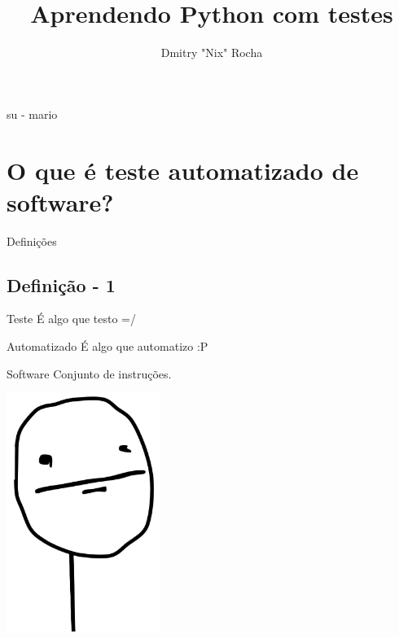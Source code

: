 \documentclass[]{beamer}
\author{Dmitry "Nix" Rocha}
\title{Aprendendo Python com testes}
\institute{ /(guru|pug-)pi/i }
\begin{document}
  \begin{frame}{}
    \titlepage
  \end{frame}

  \begin{frame}{su - mario}
    \tableofcontents
  \end{frame}

  \section{O que é teste automatizado de software?}

  \begin{frame}
    \begin{center}
      \Huge Definições
    \end{center}
  \end{frame}

  \subsection*{Definição - 1}
  \begin{frame}
    \begin{block}{Teste}
      É algo que testo =/
    \end{block}
    \pause

    \begin{block}{Automatizado}
      É algo que automatizo :P
    \end{block}
    \pause

    \begin{block}{Software}
      Conjunto de instruções.
    \end{block}
    \pause
  \end{frame}

  \invertbgcolor
  \begin{frame}
    \begin{center}
      \includegraphics[width=5cm]{images/pokerface}
    \end{center}
  \end{frame}
\end{document}
